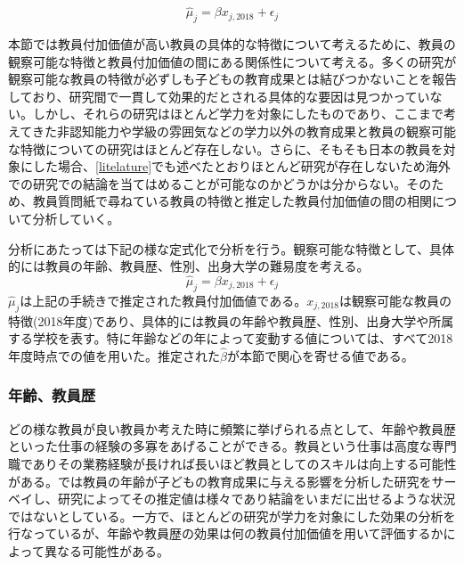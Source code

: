 \documentclass[a4paper,12pt]{article}
\begin{document}
 \begin{equation*}
  \hat{\mu}_{j} = \beta x_{j, 2018}+ \epsilon_{j}
   \label{eq_persist}
 \end{equation*}

本節では教員付加価値が高い教員の具体的な特徴について考えるために、教員の観察可能な特徴と教員付加価値の間にある関係性について考える。多くの研究が観察可能な教員の特徴が必ずしも子どもの教育成果とは結びつかないことを報告しており\cite{hanushek2006teacher}、研究間で一貫して効果的だとされる具体的な要因は見つかっていない。しかし、それらの研究はほとんど学力を対象にしたものであり、ここまで考えてきた非認知能力や学級の雰囲気などの学力以外の教育成果と教員の観察可能な特徴についての研究はほとんど存在しない。さらに、そもそも日本の教員を対象にした場合、\ref{litelature}でも述べたとおりほとんど研究が存在しないため海外での研究での結論を当てはめることが可能なのかどうかは分からない。そのため、教員質問紙で尋ねている教員の特徴と推定した教員付加価値の間の相関について分析していく。


分析にあたっては下記の様な定式化で分析を行う。観察可能な特徴として、具体的には教員の年齢、教員歴、性別、出身大学の難易度を考える。
\begin{equation*}
  \hat{\mu}_{j} = \beta x_{j, 2018}+ \epsilon_{j}
   \label{eq_persist}
\end{equation*}
$ \hat{\mu}_{j} $は上記の手続きで推定された教員付加価値である。$x_{j, 2018}$は観察可能な教員の特徴(2018年度)であり、具体的には教員の年齢や教員歴、性別、出身大学や所属する学校を表す。特に年齢などの年によって変動する値については、すべて2018年度時点での値を用いた。推定された$\hat{\beta}$が本節で関心を寄せる値である。

\subsubsection*{年齢、教員歴}
どの様な教員が良い教員か考えた時に頻繁に挙げられる点として、年齢や教員歴といった仕事の経験の多寡をあげることができる。教員という仕事は高度な専門職でありその業務経験が長ければ長いほど教員としてのスキルは向上する可能性がある。\cite{hanushek2006teacher}では教員の年齢が子どもの教育成果に与える影響を分析した研究をサーベイし、研究によってその推定値は様々であり結論をいまだに出せるような状況ではないとしている。一方で、ほとんどの研究が学力を対象にした効果の分析を行なっているが、年齢や教員歴の効果は何の教員付加価値を用いて評価するかによって異なる可能性がある。
\end{document}

